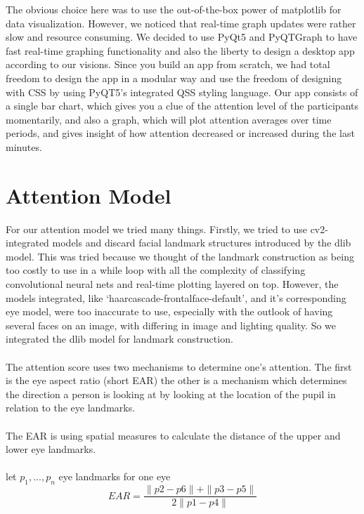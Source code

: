 \documentclass{article}
\begin{document}
The obvious choice here was to use the out-of-the-box power of matplotlib for data visualization. However, we noticed that real-time graph updates were rather slow and resource consuming.
We decided to use PyQt5 and PyQTGraph to have fast real-time graphing functionality and also the liberty to design a desktop app according to our visions. Since you build an app from scratch, we had total freedom to design the app in a modular way and use the freedom of designing with CSS by using PyQT5’s integrated QSS styling language.
Our app consists of a single bar chart, which gives you a clue of the attention level of the participants momentarily, and also a graph, which will plot attention averages over time periods, and gives insight of how attention decreased or increased during the last minutes.


\section{Attention Model}

For our attention model we tried many things. Firstly, we tried to use cv2-integrated models and discard facial landmark structures introduced by the dlib model. This was tried because we thought of the landmark construction as being too costly to use in a while loop with all the complexity of classifying convolutional neural nets and real-time plotting layered on top. However, the models integrated, like ‘haarcascade-frontalface-default’, and it’s corresponding eye model, were too inaccurate to use, especially with the outlook of having several faces on an image, with differing in image and lighting quality. So we integrated the dlib model for landmark construction.\\
\\
The attention score uses two mechanisms to determine one’s attention. The first is the eye aspect ratio (short EAR) the other is a mechanism which determines the direction a person is looking at by looking at the location of the pupil in relation to the eye landmarks.\\
\\
The EAR is using spatial measures to calculate the distance of the upper and lower eye landmarks.\\
\\
let $ p_1,...,p_n$ eye landmarks for one eye
\\
\begin{equation}
EAR = \frac{\parallel p2-p6\parallel+\parallel p3-p5\parallel}{2\parallel p1-p4\parallel}
\end{equation}
\\
\end{document}
